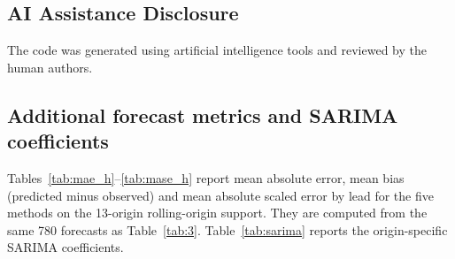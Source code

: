 \documentclass[pdflatex,sn-mathphys-ay]{sn-jnl}
\begin{document}
\subsection{AI Assistance Disclosure}

The code was generated using artificial intelligence tools and reviewed by the human authors.

\begin{appendices}

\section{Additional forecast metrics and SARIMA coefficients}\label{app:tables}

Tables~\ref{tab:mae_h}--\ref{tab:mase_h} report mean absolute error, mean bias (predicted minus observed) and mean absolute scaled error by lead for the five methods on the 13-origin rolling-origin support. They are computed from the same 780 forecasts as Table~\ref{tab:3}. Table~\ref{tab:sarima} reports the origin-specific SARIMA coefficients.






\end{appendices}


\end{document}
